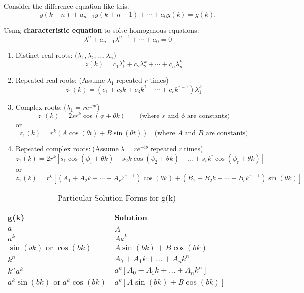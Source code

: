 Consider the difference equation like this:
\[
    y(k+n) + a_{n-1}y(k+n-1) + \cdots + a_{0}y(k) = g(k).
\]

Using \textbf{characteristic equation} to solve homogenous equations: \[
    \lambda ^{n} + a_{n-1}\lambda ^{n-1} + \cdots +a_{0} = 0
\]


\begin{enumerate}
    \item Distinct real roots: ($\lambda_1, \lambda_2,\dots,\lambda_n$) \[
              z(k) = c_1\lambda_{1}^{k} + c_2\lambda_{2}^{k}+\cdots+c_n\lambda_{n}^{k}
          \]
    \item Repeated real roots: (Assume $\lambda_1$ repeated $r$ times) \[
              z_1(k) = (c_1 + c_2k + c_3k ^{2} + \cdots +c_rk^{r-1})\lambda_{1}^{k}
          \]
    \item Complex roots: ($\lambda_1 = re ^{\pm i\theta}$) \[
              z_1(k) = 2sr ^{k}\cos(\phi + \theta k) \qquad \text{(where $s$ and $\phi$ are constants)}
          \] or \[
              z_1(k) = r ^{k}(A \cos(\theta t) + B \sin(\theta t)) \quad  \text{(where $A$ and $B$ are constants)}
          \]
    \item Repeated complex roots: (Assume $\lambda = re ^{\pm i\theta}$ repeated $r$ times)  \[
              z_1(k) = 2r ^{k}\left[s_1 \cos(\phi_1 + \theta k) + s_2 k \cos(\phi_2 + \theta k) + \dots +s_r k ^{r} \cos(\phi_r + \theta k ) \right]
          \] or \[
              z_1(k) = r ^{k}\left[(A_1 + A_2k+\cdots +A_rk ^{r-1}) \cos(\theta k) + (B_1 + B_2k+\cdots +B_rk ^{r-1}) \sin(\theta k)\right]
          \]
\end{enumerate}


\begin{table}[h!]
    \centering
    \caption{Particular Solution Forms for g(k)}
    \label{tab:particular_solutions}
    \begin{tabular}{ll}
        \toprule
        \textbf{g(k)}                           & \textbf{Solution}                     \\
        \midrule
        $a$                                     & $A$                                   \\
        $a^k$                                   & $Aa^k$                                \\
        $\sin(bk) \text{ or } \cos(bk)$         & $A \sin(bk) + B \cos(bk)$             \\
        $k^n$                                   & $A_0 + A_1 k + \dots + A_n k^n$       \\
        $k^n a^k$                               & $a^k [A_0 + A_1 k + \dots + A_n k^n]$ \\
        $a^k \sin(bk) \text{ or } a^k \cos(bk)$ & $a^k [A \sin(bk) + B \cos(bk)]$       \\
        \bottomrule
    \end{tabular}
\end{table}


